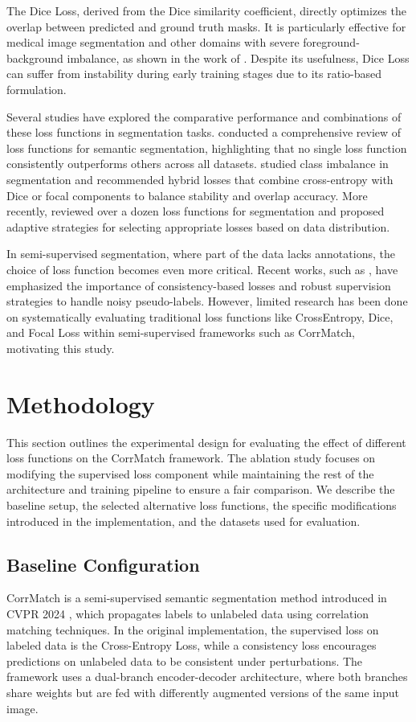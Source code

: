 \documentclass[10pt,twocolumn,letterpaper]{article}
\begin{document}
The Dice Loss, derived from the Dice similarity coefficient, directly optimizes the overlap between predicted and ground truth masks. It is particularly effective for medical image segmentation and other domains with severe foreground-background imbalance, as shown in the work of \cite{milletari2016v}. Despite its usefulness, Dice Loss can suffer from instability during early training stages due to its ratio-based formulation.

Several studies have explored the comparative performance and combinations of these loss functions in segmentation tasks. \cite{jadon2020survey} conducted a comprehensive review of loss functions for semantic segmentation, highlighting that no single loss function consistently outperforms others across all datasets. \cite{buda2018systematic} studied class imbalance in segmentation and recommended hybrid losses that combine cross-entropy with Dice or focal components to balance stability and overlap accuracy. More recently, \cite{azad2023loss} reviewed over a dozen loss functions for segmentation and proposed adaptive strategies for selecting appropriate losses based on data distribution.

In semi-supervised segmentation, where part of the data lacks annotations, the choice of loss function becomes even more critical. Recent works, such as \cite{ke2019dual}, have emphasized the importance of consistency-based losses and robust supervision strategies to handle noisy pseudo-labels. However, limited research has been done on systematically evaluating traditional loss functions like CrossEntropy, Dice, and Focal Loss within semi-supervised frameworks such as CorrMatch, motivating this study.

\section{Methodology}
This section outlines the experimental design for evaluating the effect of different loss functions on the CorrMatch framework. The ablation study focuses on modifying the supervised loss component while maintaining the rest of the architecture and training pipeline to ensure a fair comparison. We describe the baseline setup, the selected alternative loss functions, the specific modifications introduced in the implementation, and the datasets used for evaluation.

\subsection{Baseline Configuration}
CorrMatch is a semi-supervised semantic segmentation method introduced in CVPR 2024 \cite{sun2024corrmatch}, which propagates labels to unlabeled data using correlation matching techniques. In the original implementation, the supervised loss on labeled data is the Cross-Entropy Loss, while a consistency loss encourages predictions on unlabeled data to be consistent under perturbations. The framework uses a dual-branch encoder-decoder architecture, where both branches share weights but are fed with differently augmented versions of the same input image.
\end{document}
